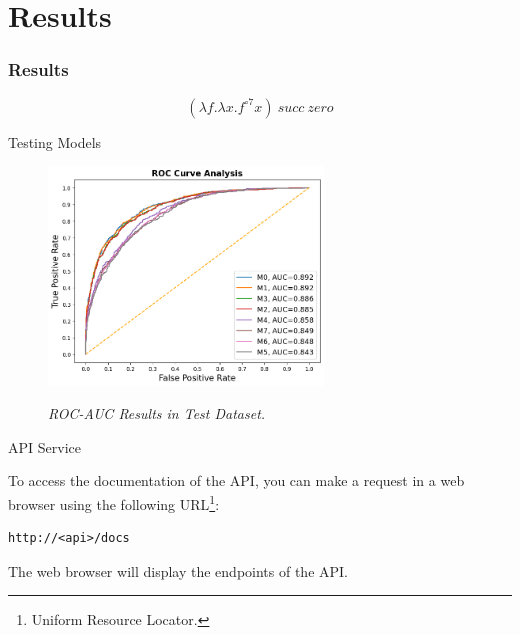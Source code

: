 \documentclass[dvipsnames,mathserif]{beamer}
\begin{document}
{    \section{Results}

    \begin{frame}
      \frametitle{Results}


      \[(\lambda f. \lambda x. f^{\circ 7} x)\ succ\ zero\]
    \end{frame}


    \begin{frame}
      \large Testing Models
      \vspace{0.25cm}
      \begin{figure}[H]
        \centering
        \includegraphics[width=0.65\textwidth]{images/rocaucanalysis-all.png}
        \caption[ROC-AUC Results in Test Dataset]{\textit{ROC-AUC Results in Test Dataset. }}
        {\label{fig:rocaucanalysis-all}}
      \end{figure}

    \end{frame}

    \begin{frame}[fragile]

      \large API Service
      \vspace{0.25cm}

      \footnotesize
      To access the documentation of the API, you can make a request in a web
      browser using the following URL\footnote{Uniform Resource Locator.}:

      \vspace{0.1cm}

      \begin{Verbatim}[fontsize=\tiny]
http://<api>/docs
      \end{Verbatim}

      The web browser will display the endpoints of the API.


\end{frame}}
\end{document}
